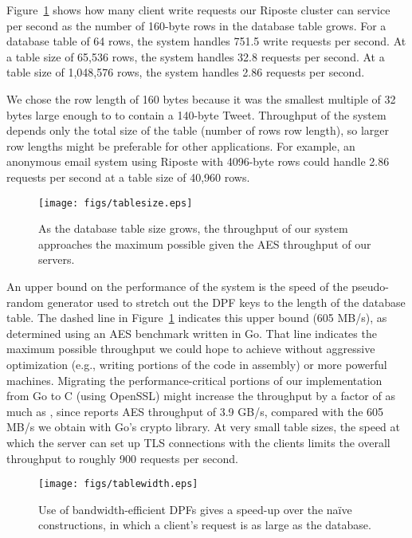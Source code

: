 \documentclass[10pt,twocolumn]{article}
\newcommand{\name}{Riposte\xspace}
\begin{document}
Figure~\ref{fig:tablesize} shows how many client write requests
our \name cluster can service per second as the number of 160-byte
rows in the database table grows.
For a database table of 64 rows, the system handles 
751.5 write requests per second.
At a table size of 65,536 rows, the system handles 32.8 requests
per second.
At a table size of 1,048,576 rows, the system handles 2.86 requests
per second.

We chose the row length of 160 bytes because it was the smallest
multiple of 32 bytes large enough to to contain a 140-byte Tweet.
Throughput of the system depends only the total
size of the table (number of rows  row length), so larger
row lengths might be preferable for other applications.
For example, an anonymous email system using \name with 
4096-byte rows could handle 2.86 requests per second at a table
size of 40,960 rows.

\begin{figure}
\centering
\texttt{[image: figs/tablesize.eps]}
\caption{As the database table size grows, the throughput of
  our system approaches the maximum possible given the 
  AES throughput of our servers.}
\label{fig:tablesize}
\end{figure}

An upper bound on the performance of the system is the speed 
of the pseudo-random generator used to stretch out the
DPF keys to the length of the database table.
The dashed line in Figure~\ref{fig:tablesize} indicates this upper
bound (605 MB/s), as determined using an AES benchmark written in Go.
That line indicates the maximum possible throughput we could hope
to achieve without aggressive optimization (e.g., writing portions of
the code in assembly) or more powerful machines.
Migrating the performance-critical
portions of our implementation from Go to C (using OpenSSL)
might increase the throughput by a factor of as much as
, since  reports AES throughput of 3.9 GB/s,
compared with the 605 MB/s we obtain with Go's crypto library.
At very small table sizes, the speed at which the server can set up
TLS connections with the clients limits the overall throughput
to roughly 900 requests per second.

\begin{figure}
\centering
\texttt{[image: figs/tablewidth.eps]}
\caption{Use of bandwidth-efficient DPFs gives 
 a  speed-up over the na\"ive constructions,
 in which a client's request is as large as the database.}
\label{fig:tablewidth}
\end{figure}
\end{document}
